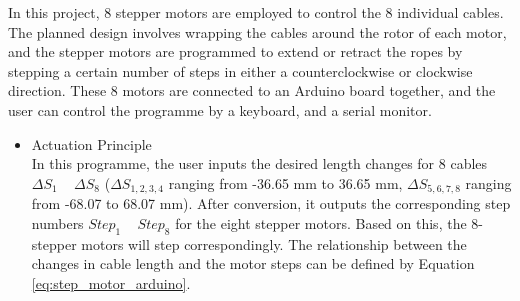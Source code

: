 In this project, 8 stepper motors are employed to control the 8 individual cables. The planned design involves 
wrapping the cables around the rotor of each motor, and the stepper motors are programmed to extend or retract 
the ropes by stepping a certain number of steps in either a counterclockwise or clockwise direction. These 8 motors 
are connected to an Arduino board together, and the user can control the programme by a keyboard, and a serial monitor. 
\begin{itemize}
    \item Actuation Principle\\
    In this programme, the user inputs the desired length changes for 8 cables $\Delta S_1$ ~ $\Delta S_8$ 
    ($\Delta S_{1,2,3,4}$ ranging from -36.65 mm to 36.65 mm, $\Delta S_{5,6,7,8}$ ranging from -68.07 to 68.07 mm). 
    After conversion, it outputs the corresponding step numbers $Step_1$ ~ $Step_8$ for the eight stepper motors. 
    Based on this, the 8-stepper motors will step correspondingly. The relationship between the changes in 
    cable length and the motor steps can be defined by Equation \ref{eq:step_motor_arduino}. 
    

\end{itemize}
